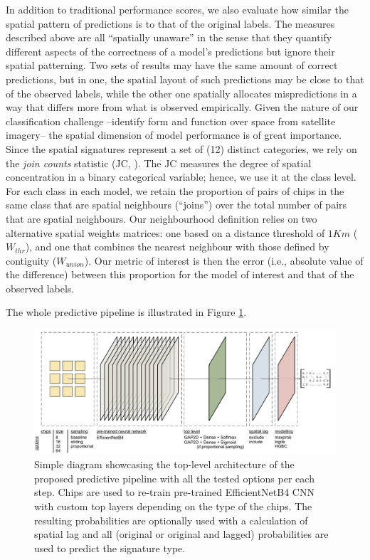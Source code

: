 In addition to traditional performance scores, we also evaluate how similar
the spatial pattern of predictions is to that of the original labels.
The measures described above are all ``spatially unaware'' in the sense that
they quantify different aspects of the correctness of a model's
predictions but ignore their spatial patterning. Two
sets of results may have the same amount of correct predictions, but in one,
the spatial layout of such predictions may be close to
that of the observed labels, while the other one spatially allocates mispredictions in
a way that differs more from what is observed empirically. Given the nature of
our classification challenge --identify form and
function over space from satellite imagery-- the spatial dimension of model
performance is of great importance. Since the spatial signatures represent a
set of (12) distinct categories, we rely on the \textit{join counts} statistic
(JC, \citealp{cliff1981spatial}). The JC measures the degree of spatial
concentration in a binary categorical variable; hence, we use it at the class
level. For each class in each model, we retain the proportion of pairs of
chips in the same class that are spatial neighbours (``joins'') over the total number of
pairs that are spatial neighbours.
Our neighbourhood definition relies on two alternative spatial weights matrices:
one based on a distance threshold of $1Km$ ($W_{thr}$), and one that combines
the nearest neighbour with those defined by contiguity ($W_{union}$).
Our metric of interest is then the error (i.e., absolute
value of the difference) between this proportion for the model of interest and
that of the observed labels.

The whole predictive pipeline is illustrated in Figure \ref{fig:architecture}.

\begin{figure}
    \centering
    \includegraphics[width=\linewidth]{fig/signature_ai_architecture.pdf}
    \caption{Simple diagram showcasing the top-level architecture of the proposed
    predictive pipeline with all the tested options per each step. Chips are used to
    re-train pre-trained EfficientNetB4 CNN with custom top layers depending on the type
    of the chips. The resulting probabilities are optionally used with a calculation of
    spatial lag and all (original or original and lagged) probabilities are used to
    predict the signature type.}
    \label{fig:architecture}
\end{figure}


